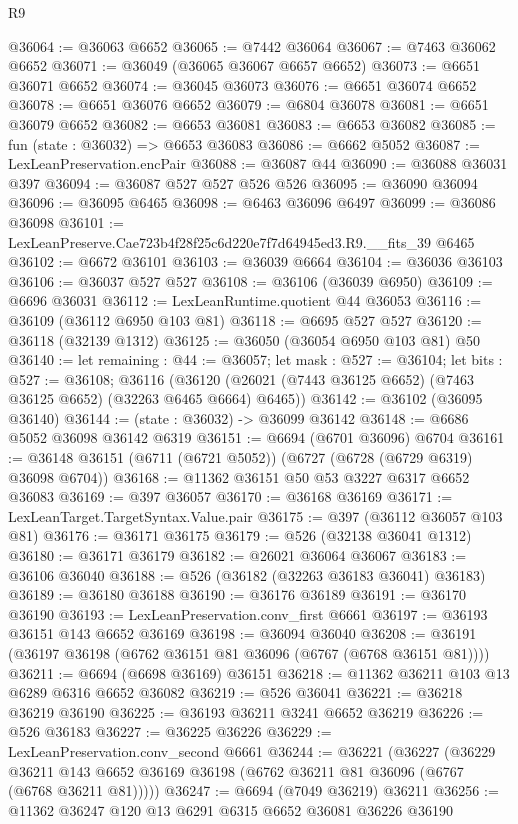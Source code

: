 \begin{lexlean}{R9}
\begin{coremodule}
@36064 := @36063 @6652
@36065 := @7442 @36064
@36067 := @7463 @36062 @6652
@36071 := @36049 (@36065 @36067 @6657 @6652)
@36073 := @6651 @36071 @6652
@36074 := @36045 @36073
@36076 := @6651 @36074 @6652
@36078 := @6651 @36076 @6652
@36079 := @6804 @36078
@36081 := @6651 @36079 @6652
@36082 := @6653 @36081
@36083 := @6653 @36082
@36085 := fun (state : @36032) => @6653 @36083
@36086 := @6662 @5052
@36087 := LexLeanPreservation.encPair
@36088 := @36087 @44
@36090 := @36088 @36031 @397
@36094 := @36087 @527 @527 @526 @526
@36095 := @36090 @36094
@36096 := @36095 @6465
@36098 := @6463 @36096 @6497
@36099 := @36086 @36098
@36101 := LexLeanPreserve.Cae723b4f28f25c6d220e7f7d64945ed3.R9.__fits_39 @6465
@36102 := @6672 @36101
@36103 := @36039 @6664
@36104 := @36036 @36103
@36106 := @36037 @527 @527
@36108 := @36106 (@36039 @6950)
@36109 := @6696 @36031
@36112 := LexLeanRuntime.quotient @44 @36053
@36116 := @36109 (@36112 @6950 @103 @81)
@36118 := @6695 @527 @527
@36120 := @36118 (@32139 @1312)
@36125 := @36050 (@36054 @6950 @103 @81) @50
@36140 := let remaining : @44 := @36057;
  let mask : @527 := @36104;
  let bits : @527 := @36108;
  @36116 (@36120 (@26021 (@7443 @36125 @6652) (@7463 @36125 @6652) (@32263 @6465 @6664) @6465))
@36142 := @36102 (@36095 @36140)
@36144 := (state : @36032) -> @36099 @36142
@36148 := @6686 @5052 @36098 @36142 @6319
@36151 := @6694 (@6701 @36096) @6704
@36161 := @36148 @36151 (@6711 (@6721 @5052)) (@6727 (@6728 (@6729 @6319) @36098 @6704))
@36168 := @11362 @36151 @50 @53 @3227 @6317 @6652 @36083
@36169 := @397 @36057
@36170 := @36168 @36169
@36171 := LexLeanTarget.TargetSyntax.Value.pair
@36175 := @397 (@36112 @36057 @103 @81)
@36176 := @36171 @36175
@36179 := @526 (@32138 @36041 @1312)
@36180 := @36171 @36179
@36182 := @26021 @36064 @36067
@36183 := @36106 @36040
@36188 := @526 (@36182 (@32263 @36183 @36041) @36183)
@36189 := @36180 @36188
@36190 := @36176 @36189
@36191 := @36170 @36190
@36193 := LexLeanPreservation.conv_first @6661
@36197 := @36193 @36151 @143 @6652 @36169
@36198 := @36094 @36040
@36208 := @36191 (@36197 @36198 (@6762 @36151 @81 @36096 (@6767 (@6768 @36151 @81))))
@36211 := @6694 (@6698 @36169) @36151
@36218 := @11362 @36211 @103 @13 @6289 @6316 @6652 @36082
@36219 := @526 @36041
@36221 := @36218 @36219 @36190
@36225 := @36193 @36211 @3241 @6652 @36219
@36226 := @526 @36183
@36227 := @36225 @36226
@36229 := LexLeanPreservation.conv_second @6661
@36244 := @36221
    (@36227
      (@36229 @36211 @143 @6652 @36169 @36198 (@6762 @36211 @81 @36096 (@6767 (@6768 @36211 @81)))))
@36247 := @6694 (@7049 @36219) @36211
@36256 := @11362 @36247 @120 @13 @6291 @6315 @6652 @36081 @36226 @36190

\end{coremodule}
\end{lexlean}

